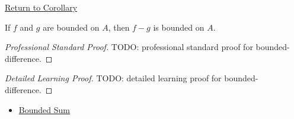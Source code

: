 \newpage
{}
\label{prf:bounded-difference}

\begin{remark*}[Return]
\hyperref[cor:bounded-difference]{Return to Corollary}
\end{remark*}

\begin{corollary*}
If \(f\) and \(g\) are bounded on \(A\), then \(f-g\) is bounded on \(A\).
\end{corollary*}

\begin{proof}[Professional Standard Proof]
\LRAProofBodyStart
TODO: professional standard proof for bounded-difference.
\end{proof}

\begin{proof}[Detailed Learning Proof]
\LRAProofBodyStart
TODO: detailed learning proof for bounded-difference.
\end{proof}

\begin{remark*}
\end{remark*}

\begin{dependencies}
\begin{itemize}
  \item \hyperref[cor:bounded-sum]{Bounded Sum}
\end{itemize}
\end{dependencies}

\clearpage
